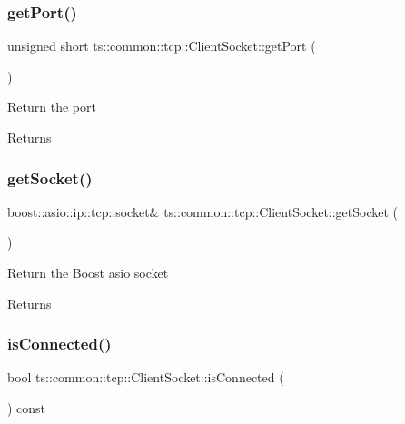 \subsubsection{\texorpdfstring{get\+Port()}{getPort()}}
{\footnotesize\ttfamily unsigned short ts\+::common\+::tcp\+::\+Client\+Socket\+::get\+Port (\begin{DoxyParamCaption}{ }\end{DoxyParamCaption})}

Return the port \begin{DoxyReturn}{Returns}

\end{DoxyReturn}
\mbox{\label{classts_1_1common_1_1tcp_1_1_client_socket_a951aaa6937d4acd0020d30aa8481a485}} 
\subsubsection{\texorpdfstring{get\+Socket()}{getSocket()}}
{\footnotesize\ttfamily boost\+::asio\+::ip\+::tcp\+::socket\& ts\+::common\+::tcp\+::\+Client\+Socket\+::get\+Socket (\begin{DoxyParamCaption}{ }\end{DoxyParamCaption})}

Return the Boost asio socket \begin{DoxyReturn}{Returns}

\end{DoxyReturn}
\mbox{\label{classts_1_1common_1_1tcp_1_1_client_socket_a654e7f9378b5143032c767486f1752f2}} 
\subsubsection{\texorpdfstring{is\+Connected()}{isConnected()}}
{\footnotesize\ttfamily bool ts\+::common\+::tcp\+::\+Client\+Socket\+::is\+Connected (\begin{DoxyParamCaption}{ }\end{DoxyParamCaption}) const}

